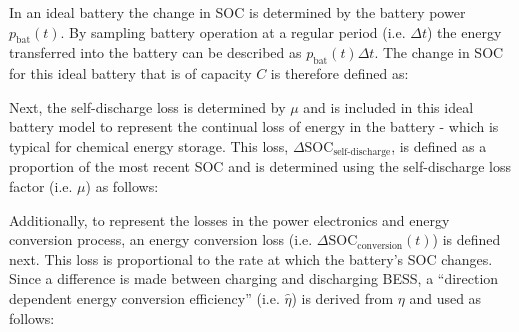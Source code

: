 \nomenclature[L]{$\mu$}{Self-discharge loss factor, where $\mu \in (0, 1]$}
\nomenclature[L]{$\eta$}{Energy conversion efficiency, where $\eta \in (0, 1]$}
\nomenclature[L]{$\hat{\eta}$}{Direction dependent energy conversion efficiency, where $\hat{\eta} \in (0, 1]$}

In an ideal battery the change in SOC is determined by the battery power $p_\text{bat}(t)$.
By sampling battery operation at a regular period (i.e. $\Delta t$) the energy transferred into the battery can be described as $p_\text{bat}(t)\Delta t$.
The change in SOC for this ideal battery that is of capacity $C$ is therefore defined as:



Next, the self-discharge loss is determined by $\mu$ and is included in this ideal battery model to represent the continual loss of energy in the battery - which is typical for chemical energy storage.
This loss, $\Delta\text{SOC}_\text{self-discharge}$, is defined as a proportion of the most recent SOC and is determined using the self-discharge loss factor (i.e. $\mu$) as follows:



Additionally, to represent the losses in the power electronics and energy conversion process, an energy conversion loss (i.e. $\Delta\text{SOC}_\text{conversion}(t)$) is defined next.
This loss is proportional to the rate at which the battery's SOC changes.
Since a difference is made between charging and discharging BESS, a ``direction dependent energy conversion efficiency'' (i.e. $\hat{\eta}$) is derived from $\eta$ and used as follows:

